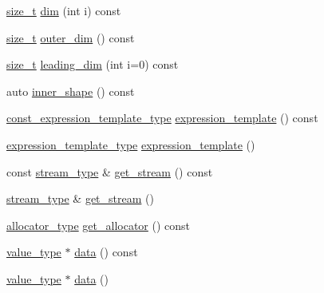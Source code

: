 \begin{DoxyCompactItemize}
\item 
\hyperlink{namespacebc_aaf8e3fbf99b04b1b57c4f80c6f55d3c5}{size\+\_\+t} \hyperlink{structbc_1_1tensors_1_1exprs_1_1Vector_a15758a965721b43487a91aee601bc794}{dim} (int i) const
\item 
\hyperlink{namespacebc_aaf8e3fbf99b04b1b57c4f80c6f55d3c5}{size\+\_\+t} \hyperlink{structbc_1_1tensors_1_1exprs_1_1Vector_a1bc72dcd2b0ab03a431d32d7df9c6e04}{outer\+\_\+dim} () const
\item 
\hyperlink{namespacebc_aaf8e3fbf99b04b1b57c4f80c6f55d3c5}{size\+\_\+t} \hyperlink{structbc_1_1tensors_1_1exprs_1_1Vector_aab8ecb4d931af209675dacd7aeb01983}{leading\+\_\+dim} (int i=0) const
\item 
auto \hyperlink{structbc_1_1tensors_1_1exprs_1_1Vector_a46586fd464f9c39cc27acb99ce9442c0}{inner\+\_\+shape} () const
\item 
\hyperlink{structbc_1_1tensors_1_1exprs_1_1Kernel__Array}{const\+\_\+expression\+\_\+template\+\_\+type} \hyperlink{structbc_1_1tensors_1_1exprs_1_1Vector_a30ea0e61d1f409c405cc29610241170e}{expression\+\_\+template} () const
\item 
\hyperlink{structbc_1_1tensors_1_1exprs_1_1Kernel__Array}{expression\+\_\+template\+\_\+type} \hyperlink{structbc_1_1tensors_1_1exprs_1_1Vector_ad5c1189f69b902afa3f7f64d7c5d052c}{expression\+\_\+template} ()
\item 
const \hyperlink{structbc_1_1tensors_1_1exprs_1_1Vector_a6a9edbbd7f8743e3a303e64ac887e498}{stream\+\_\+type} \& \hyperlink{structbc_1_1tensors_1_1exprs_1_1Vector_a1efa78ba3b993bdbdbae6b0c35ad82b3}{get\+\_\+stream} () const
\item 
\hyperlink{structbc_1_1tensors_1_1exprs_1_1Vector_a6a9edbbd7f8743e3a303e64ac887e498}{stream\+\_\+type} \& \hyperlink{structbc_1_1tensors_1_1exprs_1_1Vector_a80c98aea7bfd223ce7edfffe41e0e1e1}{get\+\_\+stream} ()
\item 
\hyperlink{structbc_1_1tensors_1_1exprs_1_1Vector_a94fd93f892cde60396b78ab67b180a19}{allocator\+\_\+type} \hyperlink{structbc_1_1tensors_1_1exprs_1_1Vector_aeca332b35e2515e9d6dadbf03289f6cc}{get\+\_\+allocator} () const
\item 
\hyperlink{structbc_1_1tensors_1_1exprs_1_1Vector_a61ba759af8b26329103ce2b0765dade5}{value\+\_\+type} $\ast$ \hyperlink{structbc_1_1tensors_1_1exprs_1_1Vector_a85aed13ca9f7982a57086d5bd3fdcf19}{data} () const
\item 
\hyperlink{structbc_1_1tensors_1_1exprs_1_1Vector_a61ba759af8b26329103ce2b0765dade5}{value\+\_\+type} $\ast$ \hyperlink{structbc_1_1tensors_1_1exprs_1_1Vector_a2484a59b041fafbbeb45b00a34e4702f}{data} ()

\end{DoxyCompactItemize}
